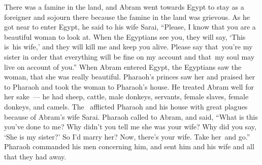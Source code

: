 \begin{inparaenum}
   There was a famine in the land, and Abram went towards Egypt to stay as a foreigner and sojourn there because the famine in the land was grievous.%
   As he got near to enter Egypt, he said to his wife Sarai, ``Please, I know that you are a beautiful woman to look at.%
   When the Egyptians see you, they will say, `This is\understood{}\ his wife,' and they will kill me and keep you alive.%
   Please say that\understood{}\ you're my sister in order that everything will be fine on my account and that\understood{}\ my soul may live on account of you.''%
   When Abram entered Egypt, the Egyptians saw the woman, that she was really beautiful.%
   Pharaoh's princes saw her and praised her to Pharaoh and took the woman to Pharaoh's house.%
   He treated Abram well for her sake~--- he had sheep, cattle, male donkeys, servants, female slaves, female donkeys, and camels.%
   The \lord\ afflicted Pharaoh and his house with great plagues because of Abram's wife Sarai.%
   Pharaoh called to Abram, and said, ``What is this you've done to me? Why didn't you tell me she was your wife?%
   Why did you say, `She is my sister?' So I'd marry her? Now, there's your wife. Take her\understood{}\ and go.''%
   Pharaoh commanded his men concerning him, and sent him and his wife and all that they had away.%
\end{inparaenum}
